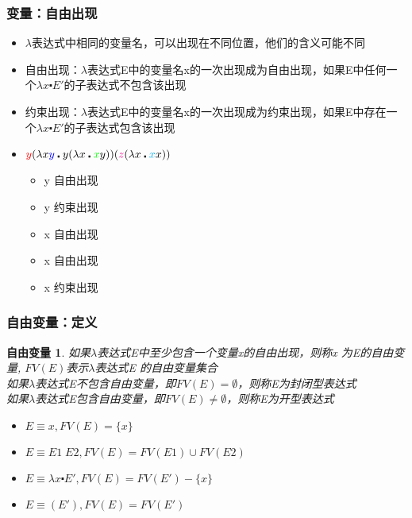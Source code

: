 \documentclass[CJKutf8,compress,hyperref]{beamer}
\begin{document}
\begin{CJK}{UTF8}{song}
\begin{frame} 
  \frametitle{ 变量：自由出现}  
  \begin{itemize}
  \item $\lambda$表达式中相同的变量名，可以出现在不同位置，他们的含义可能不同
  \item 自由出现：$\lambda$表达式E中的变量名x的一次出现成为自由出现，如果E中任何一个$\lambda x \centerdot E'$的子表达式不包含该出现 
  \item 约束出现：$\lambda$表达式E中的变量名x的一次出现成为约束出现，如果E中存在一个$\lambda x \centerdot E'$的子表达式包含该出现 
  \item ${\color{red}y}(\lambda x {\color{blue}y} \centerdot y (\lambda x \centerdot {\color{green}x}y))
    ({\color{magenta}z} (\lambda x \centerdot {\color{cyan}x}x))$ 
    \begin{itemize} 
    \item {\color{red}y} 自由出现
    \item {\color{blue}y} 约束出现 
    \item {\color{green}x} 自由出现 
    \item {\color{magenta}x} 自由出现 
    \item {\color{cyan}x} 约束出现 
    \end{itemize} 
  \end{itemize}  
\end{frame}

\begin{frame}
  \frametitle{ 自由变量：定义} 
  \newtheorem{fv}{自由变量} 
  \begin{fv}
    如果$\lambda$表达式E中至少包含一个变量x的自由出现，则称x
    为E的{\color{red}自由变量}, $FV(E)$表示$\lambda$表达式E
    的自由变量集合 \\ 
    如果$\lambda$表达式E不包含自由变量，即$FV(E) = \emptyset$，则称E为封闭型表达式\\ 
    如果$\lambda$表达式E包含自由变量，即$FV(E) \neq \emptyset$，则称E为开型表达式
  \end{fv} 
  \begin{itemize}
  \item  
    $E \equiv x , FV(E) = \{ x \}$
  \item       
    $E \equiv E1 \; E2,  FV(E) =  FV(E1) \cup FV(E2) $    
  \item
    $E \equiv \lambda x \centerdot E',  FV(E) =  FV(E')
    -\{ x \}     $
  \item
    $E \equiv (E'), FV(E) =  FV(E') $
  \end{itemize}
\end{frame}


\end{CJK}
\end{document}
